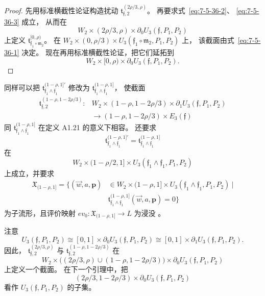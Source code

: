 \begin{proof}
先用标准横截性论证构造扰动
$\mathfrak t_{\mathfrak f,2}^{(2\rho/3,\rho)}$。
再要求式~\eqref{eq:7-5-36-2}、
\eqref{eq:7-5-36-3} 成立，
从而在
\[
W_2\times(2\rho/3,\rho)\times
\partial_0U_3(\mathfrak f,P_1,P_2)
\]
上定义
$\mathfrak t_{\mathfrak f_1\circ\mathfrak m_2}^{[0,\rho)}$。
在
$W_2\times(0,\rho/3)\times
U_3(\mathfrak f_1\circ\mathfrak m_2,P_1,P_2)$ 上，
该截面由式~\eqref{eq:7-5-36-1} 决定。
现在再用标准横截性论证，把它们延拓到
\[
W_2\times[0,\rho)\times
\partial_0U_3(\mathfrak f,P_1,P_2).
\]
\end{proof}

同样可以把
$\mathfrak t_{\mathfrak f_1\wedge\mathfrak f_1}^{(1-\rho,1]'}$
修改为
$\mathfrak t_{\mathfrak f_1\wedge\mathfrak f_1}^{(1-\rho,1]}$，
使截面
\[
\begin{aligned}
\mathfrak t_{\mathfrak f,2}^{(1-\rho,1-2\rho/3)}\colon
&W_2\times(1-\rho,1-2\rho/3)\times
\partial_1U_3(\mathfrak f,P_1,P_2)\\
&\longrightarrow
(1-\rho,1-2\rho/3)\times E_3(\mathfrak f)
\end{aligned}
\]
同
$\mathfrak t_{\mathfrak f_1\wedge\mathfrak f_1}^{(1-\rho,1]}$
在定义 A1.21 的意义下相容。
还要求
\[
\mathfrak t_{\mathfrak f_1\wedge\mathfrak f_1}^{(1-\rho,1]'}
=\mathfrak t_{\mathfrak f_1\wedge\mathfrak f_1}^{(1-\rho,1]}
\]
在
\[
W_2\times(1-\rho/2,1]\times
U_3(\mathfrak f_1\wedge\mathfrak f_1,P_1,P_2)
\]
上成立，并要求
\[
\begin{aligned}
\mathfrak X_{(1-\rho,1]}
=\bigl\{(\vec w,a,\mathbf p)&\in
W_2\times(1-\rho,1]\times
U_3(\mathfrak f_1\wedge\mathfrak f_1,P_1,P_2)\ \big|\\
&\mathfrak t_{\mathfrak f_1\wedge\mathfrak f_1}^{(1-\rho,1]}
(\vec w,a,\mathbf p)=0\bigr\}
\end{aligned}
\]
为子流形，且评价映射
$ev_0\colon\mathfrak X_{(1-\rho,1]}\to L$ 为浸没
\translatornote{源书把上述相等式的定义域写成
$U_2(\mathfrak f_1\wedge\mathfrak f_1;P_1,P_2)$，
但该空间在本节定义并始终记作 $U_3$；
又在 $\mathfrak X_{(1-\rho,1]}$ 的零点条件中误用了
$\mathfrak t_{\mathfrak f_1\circ\mathfrak m_2}^{[0,\rho)}$。
译文按当前 $\partial_1$ 端的仓西坐标图及扰动改正。
见疑误 A-0623。}。

注意
\[
U_3(\mathfrak f,P_1,P_2)
\cong[0,1]\times\partial_0U_3(\mathfrak f,P_1,P_2)
\cong[0,1]\times\partial_1U_3(\mathfrak f,P_1,P_2).
\]
因此，
$\mathfrak t_{\mathfrak f,2}^{(2\rho/3,\rho)}$ 与
$\mathfrak t_{\mathfrak f,2}^{(1-\rho,1-2\rho/3)}$
在
\[
W_2\times
\bigl((2\rho/3,\rho)\cup(1-\rho,1-2\rho/3)\bigr)
\times\partial_0U_3(\mathfrak f,P_1,P_2)
\]
上定义一个截面。
在下一个引理中，把
\[
(2\rho/3,1-2\rho/3)
\times\partial_0U_3(\mathfrak f,P_1,P_2)
\]
看作 $U_3(\mathfrak f,P_1,P_2)$ 的子集。


